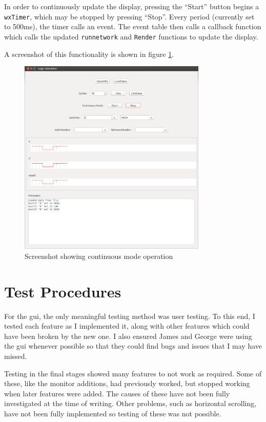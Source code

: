 \documentclass[a4paper,10pt]{article}  %
\begin{document}
In order to continuously update the display, pressing the ``Start''
button begins a \texttt{wxTimer}, which may be stopped by pressing
``Stop''. Every period (currently set to 500ms), the timer calls an
event. The event table then calls a callback function which calls the
updated \texttt{runnetwork} and \texttt{Render} functions to update
the display.

A screenshot of this functionality is shown in figure \ref{fig:contss}.
\begin{figure}[!htb]
  \begin{center}
    \includegraphics[width=0.8\textwidth]{Cont_screenshot.png}
  \end{center}
  \caption{Screenshot showing continuous mode operation}
  \label{fig:contss}
\end{figure}

\section{Test Procedures}
\label{sec:test-procedures}

For the gui, the only meaningful testing method was user testing. To
this end, I tested each feature as I implemented it, along with other
features which could have been broken by the new one. I also ensured
James and George were using the gui whenever possible so that they
could find bugs and issues that I may have missed.

Testing in the final stages showed many features to not work as
required. Some of these, like the monitor additions, had previously
worked, but stopped working when later features were added. The causes
of these have not been fully investigated at the time of
writing. Other problems, such as horizontal scrolling, have not been
fully implemented so testing of these was not possible.
\end{document}
